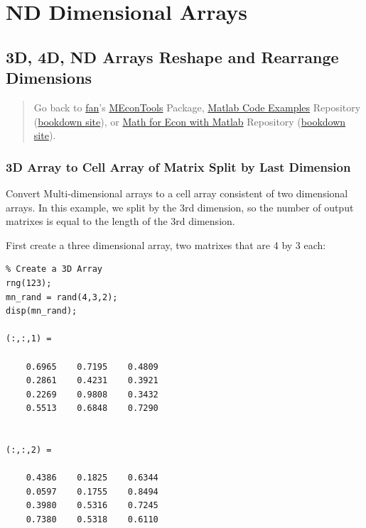 \documentclass[
]{book}
\begin{document}
\hypertarget{nd-dimensional-arrays}{%
\section{ND Dimensional Arrays}\label{nd-dimensional-arrays}}

\hypertarget{d-4d-nd-arrays-reshape-and-rearrange-dimensions}{%
\subsection{3D, 4D, ND Arrays Reshape and Rearrange Dimensions}\label{d-4d-nd-arrays-reshape-and-rearrange-dimensions}}

\begin{quote}
Go back to \href{http://fanwangecon.github.io/}{fan}'s \href{https://fanwangecon.github.io/MEconTools/}{MEconTools} Package, \href{https://fanwangecon.github.io/M4Econ/}{Matlab Code Examples} Repository (\href{https://fanwangecon.github.io/M4Econ/bookdown}{bookdown site}), or \href{https://fanwangecon.github.io/Math4Econ/}{Math for Econ with Matlab} Repository (\href{https://fanwangecon.github.io/Math4Econ/bookdown}{bookdown site}).
\end{quote}

\hypertarget{d-array-to-cell-array-of-matrix-split-by-last-dimension}{%
\subsubsection{3D Array to Cell Array of Matrix Split by Last Dimension}\label{d-array-to-cell-array-of-matrix-split-by-last-dimension}}

Convert Multi-dimensional arrays to a cell array consistent of two
dimensional arrays. In this example, we split by the 3rd dimension, so
the number of output matrixes is equal to the length of the 3rd
dimension.

First create a three dimensional array, two matrixes that are 4 by 3
each:

\begin{verbatim}
% Create a 3D Array
rng(123);
mn_rand = rand(4,3,2);
disp(mn_rand);

(:,:,1) =

    0.6965    0.7195    0.4809
    0.2861    0.4231    0.3921
    0.2269    0.9808    0.3432
    0.5513    0.6848    0.7290


(:,:,2) =

    0.4386    0.1825    0.6344
    0.0597    0.1755    0.8494
    0.3980    0.5316    0.7245
    0.7380    0.5318    0.6110
\end{verbatim}
\end{document}
